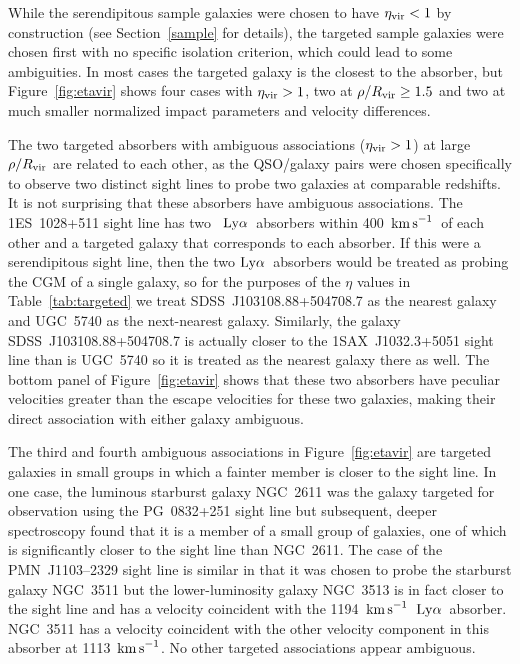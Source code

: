 \documentclass[twocolumn,twocolappendix,tighten,times]{aastex6}
\newcommand{\HI}{\ion{H}{1}}
\newcommand{\kms}{\ensuremath{{\rm km\,s}^{-1}}}
\newcommand{\lya}{\ensuremath{{\rm Ly}\alpha}}
\begin{document}
While the serendipitous sample galaxies were chosen to have $\eta_{\rm vir} < 1$ 
by construction (see Section~\ref{sample} for details), the targeted sample 
galaxies were chosen first with no specific isolation criterion, which could lead 
to some ambiguities. In most cases the targeted galaxy is the closest to the 
absorber, but Figure~\ref{fig:etavir} shows four cases with $\eta_{\rm vir} > 1$,
two at $\rho/R_{\rm vir} \geq 1.5$ and two at much smaller normalized impact 
parameters and velocity differences.

The two targeted absorbers with ambiguous associations ($\eta_{\rm vir} > 1$) at 
large $\rho/R_{\rm vir}$ are related to each other, as the QSO/galaxy pairs were 
chosen specifically to observe two distinct sight lines to probe two galaxies at 
comparable redshifts. It is not surprising that these absorbers have ambiguous 
associations. The 1ES~1028+511 sight line has two \HI\ \lya\ absorbers within 
400~\kms\ of each other and a targeted galaxy that corresponds to each absorber. If 
this were a serendipitous sight line, then the two \lya\ absorbers would be treated 
as probing the CGM of a single galaxy, so for the purposes of the $\eta$ values in 
Table~\ref{tab:targeted} we treat SDSS~J103108.88+504708.7 as the nearest galaxy 
and UGC~5740 as the next-nearest galaxy. Similarly, the galaxy 
SDSS~J103108.88+504708.7 is actually closer to the 1SAX~J1032.3+5051 sight line 
than is UGC~5740 so it is treated as the nearest galaxy there as well. The bottom 
panel of Figure~\ref{fig:etavir} shows that these two absorbers have peculiar 
velocities greater than the escape velocities for these two galaxies, making their 
direct association with either galaxy ambiguous.

The third and fourth ambiguous associations in Figure~\ref{fig:etavir} are targeted 
galaxies in small groups in which a fainter member is closer to the sight line. In 
one case, the luminous starburst galaxy NGC~2611 was the galaxy targeted for 
observation using the PG~0832+251 sight line but subsequent, deeper spectroscopy 
found that it is a member of a small group of galaxies, one of which is significantly 
closer to the sight line than NGC~2611. The case of the PMN~J1103--2329 sight line is 
similar in that it was chosen to probe the starburst galaxy NGC~3511 but the 
lower-luminosity galaxy NGC~3513 is in fact closer to the sight line and has a 
velocity coincident with the 1194~\kms\ \lya\ absorber. NGC~3511 has a velocity 
coincident with the other velocity component in this absorber at 1113~\kms. No 
other targeted associations appear ambiguous.
\end{document}
